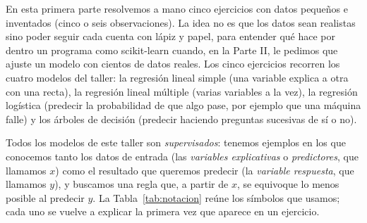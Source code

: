 \noindent En esta primera parte resolvemos a mano cinco ejercicios con
datos pequeños e inventados (cinco o seis observaciones). La idea no es
que los datos sean realistas sino poder seguir cada cuenta con lápiz y
papel, para entender qué hace por dentro un programa como scikit-learn
cuando, en la Parte II, le pedimos que ajuste un modelo con cientos de
datos reales. Los cinco ejercicios recorren los cuatro modelos del taller:
la regresión lineal simple (una variable explica a otra con una recta), la
regresión lineal múltiple (varias variables a la vez), la regresión
logística (predecir la probabilidad de que algo pase, por ejemplo que una
máquina falle) y los árboles de decisión (predecir haciendo preguntas
sucesivas de sí o no).

Todos los modelos de este taller son \emph{supervisados}: tenemos ejemplos
en los que conocemos tanto los datos de entrada (las \emph{variables
explicativas} o \emph{predictores}, que llamamos $x$) como el resultado que
queremos predecir (la \emph{variable respuesta}, que llamamos $y$), y
buscamos una regla que, a partir de $x$, se equivoque lo menos posible al
predecir $y$. La Tabla~\ref{tab:notacion} reúne los símbolos que usamos;
cada uno se vuelve a explicar la primera vez que aparece en un ejercicio.

